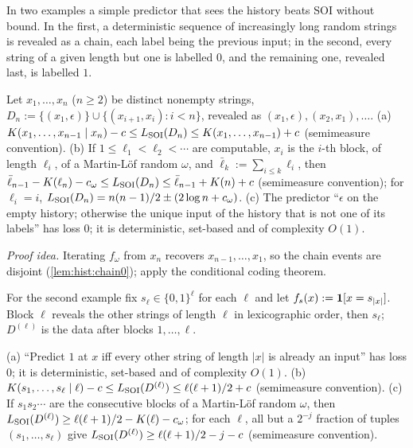 In two examples a simple predictor that sees the history beats SOI without bound. In the first, a deterministic sequence of increasingly long random strings is revealed as a chain, each label being the previous input; in the second, every string of a given length but one is labelled $0$, and the remaining one, revealed last, is labelled $1$.

\begin{theorem}\label{thm:hist:chain}
Let $x_1,\dots,x_n$ ($n\ge2$) be distinct nonempty strings, $D_n:=\{(x_1,\epsilon)\}\cup\{(x_{i+1},x_i):i<n\}$, revealed as $(x_1,\epsilon),(x_2,x_1),\dots$.
(a) $K(x_1,\dots,x_{n-1}\mid x_n)-c\le L_{\mathrm{SOI}}(D_n)\le K(x_1,\dots,x_{n-1})+c$ (semimeasure convention).
(b) If $1\le\ell_1<\ell_2<\cdots$ are computable, $x_i$ is the $i$-th block, of length $\ell_i$, of a Martin-L\"of random $\omega$, and $\bar\ell_k:=\sum_{i\le k}\ell_i$, then $\bar\ell_{n-1}-K(\ell_n)-c_\omega\le L_{\mathrm{SOI}}(D_n)\le\bar\ell_{n-1}+K(n)+c$ (semimeasure convention); for $\ell_i=i$, $L_{\mathrm{SOI}}(D_n)=n(n-1)/2\pm(2\log n+c_\omega)$.
(c) The predictor ``$\epsilon$ on the empty history; otherwise the unique input of the history that is not one of its labels'' has loss $0$; it is deterministic, set-based and of complexity $O(1)$.
\end{theorem}

\emph{Proof idea.} Iterating $f_\omega$ from $x_n$ recovers $x_{n-1},\dots,x_1$, so the chain events are disjoint (\cref{lem:hist:chain0}); apply the conditional coding theorem.

For the second example fix $s_\ell\in\{0,1\}^\ell$ for each $\ell$ and let $f_s(x):=\mathbf{1}[x=s_{|x|}]$. Block $\ell$ reveals the other strings of length $\ell$ in lexicographic order, then $s_\ell$; $D^{(\ell)}$ is the data after blocks $1,\dots,\ell$.

\begin{theorem}\label{thm:hist:skipped}
(a) ``Predict $1$ at $x$ iff every other string of length $|x|$ is already an input'' has loss $0$; it is deterministic, set-based and of complexity $O(1)$. (b) $K(s_1,\dots,s_\ell\mid\ell)-c\le L_{\mathrm{SOI}}(D^{(\ell)})\le\ell(\ell+1)/2+c$ (semimeasure convention). (c) If $s_1s_2\cdots$ are the consecutive blocks of a Martin-L\"of random $\omega$, then $L_{\mathrm{SOI}}(D^{(\ell)})\ge\ell(\ell+1)/2-K(\ell)-c_\omega$; for each $\ell$, all but a $2^{-j}$ fraction of tuples $(s_1,\dots,s_\ell)$ give $L_{\mathrm{SOI}}(D^{(\ell)})\ge\ell(\ell+1)/2-j-c$ (semimeasure convention).
\end{theorem}

